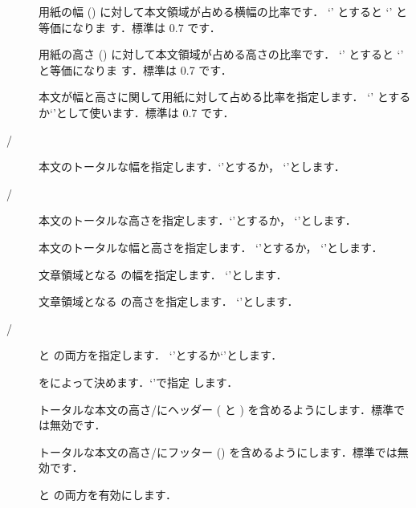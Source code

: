 \begin{description}
 \item[] 
  用紙の幅 () に対して本文領域が占める横幅の比率です．
  `' とすると `' と等価になりま
  す．標準は 0.7 です．
 \item[] 
  用紙の高さ () に対して本文領域が占める高さの比率です．
  `' とすると `' と等価になりま
  す．標準は 0.7 です．
 \item[] 
  本文が幅と高さに関して用紙に対して占める比率を指定します．
  `'
   とするか`'として使います．標準は 0.7 です．
 \item[/] 
  本文のトータルな幅を指定します．`'とするか，
  `'とします．
 \item[/] 
  本文のトータルな高さを指定します．`'とするか，
  `'とします．
 \item[] 
  本文のトータルな幅と高さを指定します．
  `'とするか，
  `'とします．
 \item[] 
   文章領域となる  の幅を指定します．
   `'とします．
 \item[]
   文章領域となる  の高さを指定します．
   `'とします．
 \item[/]
   と  の両方を指定します．
  `'とするか`'とします．
 \item[]
   をによって決めます．`'で指定
  します．
 \item[]
  トータルな本文の高さ/にヘッダー
  ( と ) を含めるようにします．標準では無効です．
 \item[]
  トータルな本文の高さ/にフッター
  () を含めるようにします．標準では無効です．
 \item[]
   と  の両方を有効にします．

\end{description}
